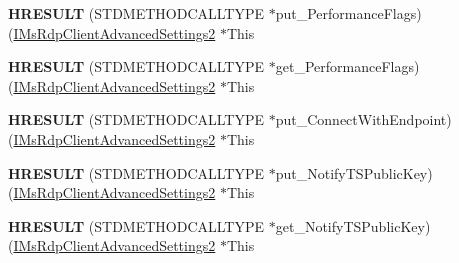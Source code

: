 \begin{DoxyCompactItemize}
{\bfseries H\+R\+E\+S\+U\+LT} (S\+T\+D\+M\+E\+T\+H\+O\+D\+C\+A\+L\+L\+T\+Y\+PE $\ast$put\+\_\+\+Performance\+Flags)(\hyperlink{interface_m_s_t_s_c_lib_1_1_i_ms_rdp_client_advanced_settings2}{I\+Ms\+Rdp\+Client\+Advanced\+Settings2} $\ast$This
\item 
\mbox{\label{struct_m_s_t_s_c_lib_1_1_i_ms_rdp_client_advanced_settings2_vtbl_aeef89edc0d75cfbaf20835b6abbb672d}} 
{\bfseries H\+R\+E\+S\+U\+LT} (S\+T\+D\+M\+E\+T\+H\+O\+D\+C\+A\+L\+L\+T\+Y\+PE $\ast$get\+\_\+\+Performance\+Flags)(\hyperlink{interface_m_s_t_s_c_lib_1_1_i_ms_rdp_client_advanced_settings2}{I\+Ms\+Rdp\+Client\+Advanced\+Settings2} $\ast$This
\item 
\mbox{\label{struct_m_s_t_s_c_lib_1_1_i_ms_rdp_client_advanced_settings2_vtbl_aa22c927d5b4c19a1de08ebac84b62925}} 
{\bfseries H\+R\+E\+S\+U\+LT} (S\+T\+D\+M\+E\+T\+H\+O\+D\+C\+A\+L\+L\+T\+Y\+PE $\ast$put\+\_\+\+Connect\+With\+Endpoint)(\hyperlink{interface_m_s_t_s_c_lib_1_1_i_ms_rdp_client_advanced_settings2}{I\+Ms\+Rdp\+Client\+Advanced\+Settings2} $\ast$This
\item 
\mbox{\label{struct_m_s_t_s_c_lib_1_1_i_ms_rdp_client_advanced_settings2_vtbl_ace418bc7c483937890790762c1681acc}} 
{\bfseries H\+R\+E\+S\+U\+LT} (S\+T\+D\+M\+E\+T\+H\+O\+D\+C\+A\+L\+L\+T\+Y\+PE $\ast$put\+\_\+\+Notify\+T\+S\+Public\+Key)(\hyperlink{interface_m_s_t_s_c_lib_1_1_i_ms_rdp_client_advanced_settings2}{I\+Ms\+Rdp\+Client\+Advanced\+Settings2} $\ast$This
\item 
\mbox{\label{struct_m_s_t_s_c_lib_1_1_i_ms_rdp_client_advanced_settings2_vtbl_a480b8928ca978f12e3270ad06a6d2f05}} 
{\bfseries H\+R\+E\+S\+U\+LT} (S\+T\+D\+M\+E\+T\+H\+O\+D\+C\+A\+L\+L\+T\+Y\+PE $\ast$get\+\_\+\+Notify\+T\+S\+Public\+Key)(\hyperlink{interface_m_s_t_s_c_lib_1_1_i_ms_rdp_client_advanced_settings2}{I\+Ms\+Rdp\+Client\+Advanced\+Settings2} $\ast$This
\item 
\mbox{\label{struct_m_s_t_s_c_lib_1_1_i_ms_rdp_client_advanced_settings2_vtbl_ab0a563a69c7fe4ed98b3959a8350e4a7}} 

\end{DoxyCompactItemize}
